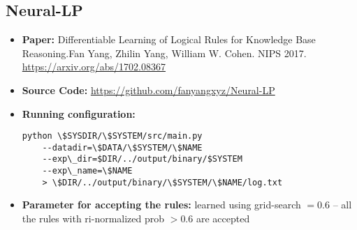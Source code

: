 \documentclass[letterpaper]{article} \usepackage{aaai20}  \usepackage{times}  \usepackage{helvet} \usepackage{courier}  \usepackage[hyphens]{url}  \usepackage{graphicx} \urlstyle{rm} \def\UrlFont{\rm}  \usepackage{graphicx}  \frenchspacing  \setlength{\pdfpagewidth}{8.5in}  \setlength{\pdfpageheight}{11in}  \usepackage{amsthm}
\theoremstyle{definition}
\begin{document}
\subsection{Neural-LP}
\begin{itemize}
\item {\bf Paper:} Differentiable Learning of Logical Rules for Knowledge Base Reasoning.Fan Yang, Zhilin Yang, William W. Cohen. NIPS 2017. \url{https://arxiv.org/abs/1702.08367}
\item {\bf Source Code:} \url{https://github.com/fanyangxyz/Neural-LP}
\item {\bf Running configuration:}
\begin{lstlisting}[basicstyle=\ttfamily\scriptsize,showstringspaces=false]
python \$SYSDIR/\$SYSTEM/src/main.py 
    --datadir=\$DATA/\$SYSTEM/\$NAME
    --exp\_dir=$DIR/../output/binary/$SYSTEM 
    --exp\_name=\$NAME 
    > \$DIR/../output/binary/\$SYSTEM/\$NAME/log.txt 
\end{lstlisting}
\item {\bf Parameter for accepting the rules:} learned using grid-search $=0.6$ -- all the rules with ri-normalized prob $> 0.6$ are accepted
\end{itemize}
\end{document}
